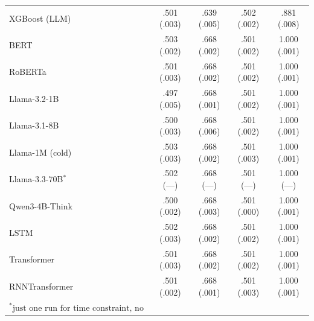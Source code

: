 \documentclass{article}
\theoremstyle{plain}
\theoremstyle{definition}
\theoremstyle{remark}
\begin{document}
\begin{table}[h]
\begin{tabular}{@{}lcccc@{}}
XGBoost (LLM) & .501 (.003) & .639 (.005) & .502 (.002) & .881 (.008) \\
BERT & .503 (.002) & .668 (.002) & .501 (.002) & 1.000 (.001) \\
RoBERTa & .501 (.003) & .668 (.002) & .501 (.002) & 1.000 (.001) \\
Llama-3.2-1B & .497 (.005) & .668 (.001) & .501 (.002) & 1.000 (.001) \\
Llama-3.1-8B & .500 (.003) & .668 (.006) & .501 (.002) & 1.000 (.001) \\
Llama-1M (cold) & .503 (.003) & .668 (.002) & .501 (.003) & 1.000 (.001) \\
Llama-3.3-70B$^{*}$ & .502 (---) & .668 (---) & .501 (---) & 1.000 (---) \\
Qwen3-4B-Think & .500 (.002) & .668 (.003) & .501 (.000) & 1.000 (.001) \\
LSTM & .502 (.003) & .668 (.002) & .501 (.002) & 1.000 (.001) \\
Transformer & .501 (.003) & .668 (.002) & .501 (.002) & 1.000 (.001) \\
RNNTransformer & .501 (.002) & .668 (.001) & .501 (.003) & 1.000 (.001) \\
\bottomrule
$^{*} \text{just one run for time constraint, no standard deviation.}$
\end{tabular}
\end{table}






\end{document}
